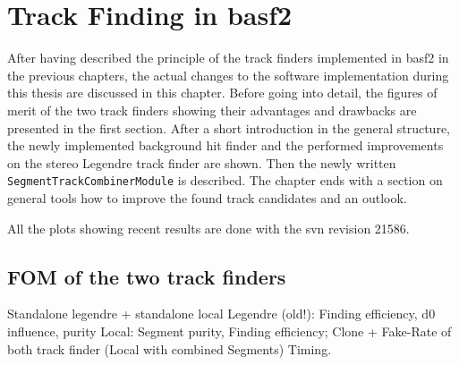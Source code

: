 \chapter{Track Finding in basf2} \label{chapter-workflow}

After having described the principle of the track finders implemented in basf2 in the previous chapters, the actual changes to the software implementation during this thesis are discussed in this chapter. Before going into detail, the figures of merit of the two track finders showing their advantages and drawbacks are presented in the first section. After a short introduction in the general structure, the newly implemented background hit finder and the performed improvements on the stereo Legendre track finder are shown. Then the newly written \texttt{SegmentTrackCombinerModule} is described. The chapter ends with a section on general tools how to improve the found track candidates and an outlook.

All the plots showing recent results are done with the svn revision 21586.

\section{FOM of the two track finders}


Standalone legendre + standalone local
Legendre (old!): Finding efficiency, d0 influence, purity
Local: Segment purity, Finding efficiency; Clone + Fake-Rate of both track finder (Local with combined Segments)
Timing.


